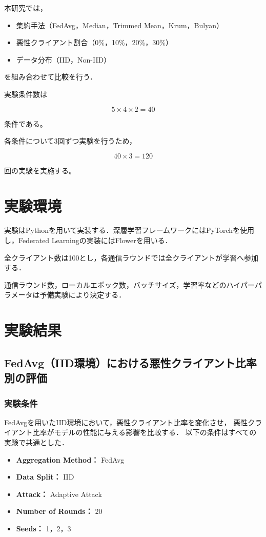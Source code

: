 \documentclass[a4j, twocolumn, dvipdfmx]{jsarticle}  %
\begin{document}
本研究では，

\begin{itemize}
\item 集約手法（FedAvg，Median，Trimmed Mean，Krum，Bulyan）
\item 悪性クライアント割合（0\%，10\%，20\%，30\%）
\item データ分布（IID，Non-IID）
\end{itemize}

を組み合わせて比較を行う．

実験条件数は

\[
5 \times 4 \times 2 = 40
\]

条件である。

各条件について3回ずつ実験を行うため，

\[
40 \times 3 = 120
\]

回の実験を実施する。

\section{実験環境}

実験はPythonを用いて実装する．深層学習フレームワークにはPyTorchを使用し，Federated Learningの実装にはFlowerを用いる．

全クライアント数は100とし，各通信ラウンドでは全クライアントが学習へ参加する．

通信ラウンド数，ローカルエポック数，バッチサイズ，学習率などのハイパーパラメータは予備実験により決定する．

\section{実験結果}
\subsection{FedAvg（IID環境）における悪性クライアント比率別の評価}

\subsubsection{実験条件}

FedAvgを用いたIID環境において，悪性クライアント比率を変化させ，
悪性クライアント比率がモデルの性能に与える影響を比較する．
以下の条件はすべての実験で共通とした．

\begin{itemize}
    \item \textbf{Aggregation Method：} FedAvg
    \item \textbf{Data Split：} IID
    \item \textbf{Attack：} Adaptive Attack
    \item \textbf{Number of Rounds：} 20
    \item \textbf{Seeds：} 1，2，3
\end{itemize}
\end{document}

